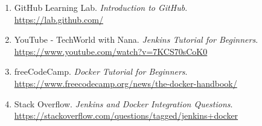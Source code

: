 \documentclass[12pt,a4paper]{article}
\begin{document}
\begin{enumerate}
    \item GitHub Learning Lab. \textit{Introduction to GitHub}. \\
    \url{https://lab.github.com/}
    
    \item YouTube - TechWorld with Nana. \textit{Jenkins Tutorial for Beginners}. \\
    \url{https://www.youtube.com/watch?v=7KCS70sCoK0}
    
    \item freeCodeCamp. \textit{Docker Tutorial for Beginners}. \\
    \url{https://www.freecodecamp.org/news/the-docker-handbook/}
    
    \item Stack Overflow. \textit{Jenkins and Docker Integration Questions}. \\
    \url{https://stackoverflow.com/questions/tagged/jenkins+docker}
\end{enumerate}
\end{document}
